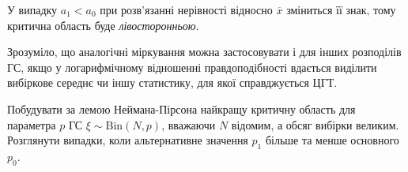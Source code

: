 У випадку $a_1 < a_0$ при розв'язанні нерівності відносно $\overline{x}$ зміниться її знак, тому критична область буде \emph{лівосторонньою}.

Зрозуміло, що аналогічні міркування можна застосовувати і для інших розподілів ГС, якщо у логарифмічному відношенні правдоподібності вдається
виділити вибіркове середнє чи іншу статистику, для якої справджується ЦГТ.

\begin{exercise}
    Побудувати за лемою Неймана-Пірсона найкращу критичну область для параметра $p$ ГС $\xi \sim \mathrm{Bin}(N, p)$, вважаючи $N$ відомим, а обсяг вибірки великим.
    Розглянути випадки, коли альтернативне значення $p_1$ більше та менше основного $p_0$.
\end{exercise}